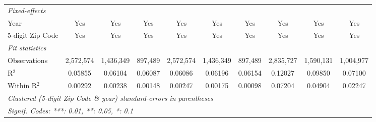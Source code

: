 \begin{tabular}{lccccccccc}
   \midrule
   \emph{Fixed-effects}\\
   Year                                                       & Yes            & Yes            & Yes            & Yes            & Yes            & Yes            & Yes            & Yes            & Yes\\  
   5-digit Zip Code                                           & Yes            & Yes            & Yes            & Yes            & Yes            & Yes            & Yes            & Yes            & Yes\\  
   \midrule
   \emph{Fit statistics}\\
   Observations                                               & 2,572,574      & 1,436,349      & 897,489        & 2,572,574      & 1,436,349      & 897,489        & 2,835,727      & 1,590,131      & 1,004,977\\  
   R$^2$                                                      & 0.05855        & 0.06104        & 0.06087        & 0.06086        & 0.06196        & 0.06154        & 0.12027        & 0.09850        & 0.07100\\  
   Within R$^2$                                               & 0.00292        & 0.00238        & 0.00148        & 0.00247        & 0.00175        & 0.00098        & 0.07204        & 0.04904        & 0.02247\\  
   \midrule \midrule
   \multicolumn{10}{l}{\emph{Clustered (5-digit Zip Code \& year) standard-errors in parentheses}}\\
   \multicolumn{10}{l}{\emph{Signif. Codes: ***: 0.01, **: 0.05, *: 0.1}}\\
\end{tabular}
\par\endgroup
